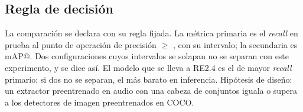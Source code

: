 \documentclass[12pt,a4paper]{article}
\begin{document}
\subsection{Regla de decisión}

La comparación se declara con su regla fijada. La métrica primaria es el \textit{recall} en
prueba al punto de operación de precisión $\geq$ \minPrecision{}, con su intervalo; la
secundaria es mAP@\matchIou{}. Dos configuraciones cuyos intervalos se solapan no se separan
con este experimento, y se dice así. El modelo que se lleva a RE2.4 es el de mayor
\textit{recall} primario; si dos no se separan, el más barato en inferencia. Hipótesis de
diseño: un extractor preentrenado en audio con una cabeza de conjuntos iguala o supera a los
detectores de imagen preentrenados en COCO.


\clearpage


\end{document}
